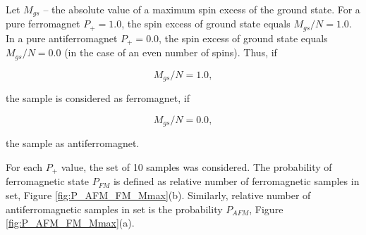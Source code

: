 \documentclass[preprint,12pt]{elsarticle}
\begin{document}
	Let $M_{gs}$ -- the absolute value of a maximum spin excess of the ground state. For a pure ferromagnet $P_+ = 1.0$, the spin excess of ground state equals $M_{gs}/N = 1.0$. In a pure antiferromagnet $P_+ = 0.0$, the spin excess of ground state equals $M_{gs}/N = 0.0$ (in the case of an even number of spins). Thus, if
		
	\begin{equation}
		M_{gs}/N = 1.0,
		\label{eq:ferr_deffinition}
	\end{equation}
		
	\noindent the sample is considered as ferromagnet, if
	
	\begin{equation}
		M_{gs}/N = 0.0,
		\label{eq:aferr_deffinition}
	\end{equation}
	
	\noindent the sample as antiferromagnet.
	
	For each $P_+$ value, the set of 10 samples was considered. The probability of ferromagnetic state $P_{FM}$ is defined as relative number of ferromagnetic samples in set, Figure \ref{fig:P_AFM_FM_Mmax}(b). Similarly, relative number of antiferromagnetic samples in set is the probability $P_{AFM}$, Figure \ref{fig:P_AFM_FM_Mmax}(a).
	
\end{document}
